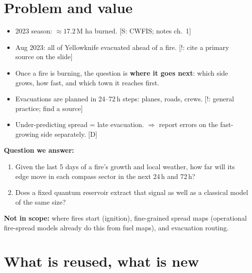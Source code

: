 \documentclass[11pt,a4paper]{article}
\newcommand{\tagbox}[2]{{\footnotesize\color{#1}\textsf{[#2]}}}
\newcommand{\supp}[1]{\tagbox{ForestGreen!70!black}{S: #1}}  %
\newcommand{\ours}{\tagbox{NavyBlue}{D}}                      %
\newcommand{\caut}[1]{\tagbox{BrickRed}{!: #1}}               %
\begin{document}
\newpage
\section{Problem and value}

\begin{itemize}
\item 2023 season: $\approx17.2$\,M ha burned. \supp{CWFIS; notes ch.~1}
\item Aug 2023: all of Yellowknife evacuated ahead of a fire. \caut{cite a primary source on the slide}
\item Once a fire is burning, the question is \textbf{where it goes next}: which side grows, how fast, and which town
  it reaches first.
\item Evacuations are planned in 24--72\,h steps: planes, roads, crews. \caut{general practice; find a source}
\item Under-predicting spread = late evacuation. $\Rightarrow$ report errors on the fast-growing side separately. \ours
\end{itemize}

\textbf{Question we answer:}
\begin{enumerate}
\item Given the last 5 days of a fire's growth and local weather, how far will its edge move in each compass
  sector in the next 24\,h and 72\,h?
\item Does a fixed quantum reservoir extract that signal as well as a classical model of the same size?
\end{enumerate}

\textbf{Not in scope:} where fires start (ignition), fine-grained spread maps (operational fire-spread models already do
this from fuel maps), and evacuation routing.

\section{What is reused, what is new}
\end{document}
